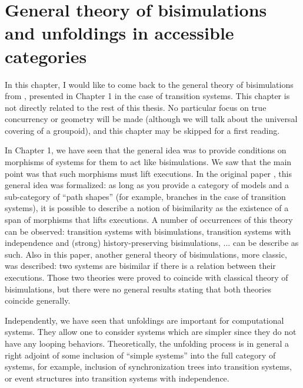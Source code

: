 \chapter{General theory of bisimulations and unfoldings in accessible categories}
\label{chap:bisunf}

In this chapter, I would like to come back to the general theory of bisimulations from \cite{joyal96}, presented in Chapter 1 in the case of transition systems. This chapter is not directly related to the rest of this thesis. No particular focus on true concurrency or geometry will be made (although we will talk about the universal covering of a groupoid), and this chapter may be skipped for a first reading.

In Chapter 1, we have seen that the general idea was to provide conditions on morphisms of systems for them to act like bisimulations. We saw that the main point was that such morphisms must lift executions. In the original paper \cite{joyal96}, this general idea was formalized: as long as you provide a category of models and a sub-category of ``path shapes'' (for example, branches in the case of transition systems), it is possible to describe a notion of bisimilarity as the existence of a span of morphisms that lifts executions. A number of occurrences of this theory can be observed: transition systems with bisimulations, transition systems with independence and (strong) history-preserving bisimulations, ... can be describe as such. Also in this paper, another general theory of bisimulations, more classic, was described: two systems are bisimilar if there is a relation between their executions. Those two theories were proved to coincide with classical theory of bisimulations, but there were no general results stating that both theories coincide generally.

Independently, we have seen that unfoldings are important for computational systems. They allow one to consider systems which are simpler since they do not have any looping behaviors. Theoretically, the unfolding process is in general a right adjoint of some inclusion of ``simple systems'' into the full category of systems, for example, inclusion of synchronization trees into transition systems, or event structures into transition systems with independence.

